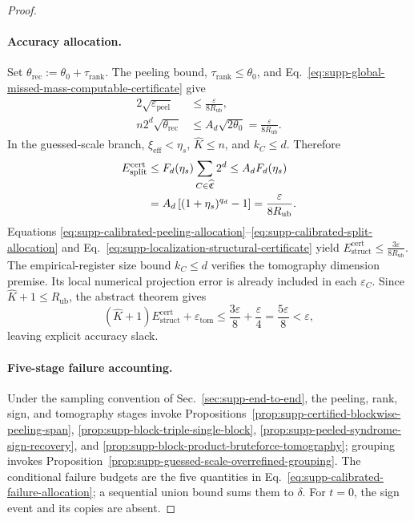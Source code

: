 \documentclass[
  aps,
  prx,
  reprint,
  superscriptaddress,
  amsmath,
  amssymb,
  nofootinbib,
  longbibliography
]{revtex4-2}
\begin{document}
\begin{proof}
\paragraph{Accuracy allocation.}
Set $\theta_{\mathrm{rec}}:=\theta_0+\tau_{\mathrm{rank}}$.  The peeling
bound, $\tau_{\mathrm{rank}}\le\theta_0$, and
Eq.~\eqref{eq:supp-global-missed-mass-computable-certificate} give
\begin{align}
2\sqrt{\varepsilon_{\mathrm{peel}}}
&\le\frac{\varepsilon}{8R_{\mathrm{ub}}},
\label{eq:supp-calibrated-peeling-allocation}\\
n2^d\sqrt{\theta_{\mathrm{rec}}}
&\le A_d\sqrt{2\theta_0}
=\frac{\varepsilon}{8R_{\mathrm{ub}}}.
\label{eq:supp-calibrated-missed-allocation}
\end{align}
In the guessed-scale branch,
\(\xi_{\mathrm{eff}}<\eta_s\), \(\widehat K\le n\), and \(k_C\le d\).
Therefore
\begin{align}
E_{\mathrm{split}}^{\mathrm{cert}}
&\le F_d(\eta_s)\sum_{C\in\widehat{\mathfrak C}}2^d
\le A_dF_d(\eta_s)
\notag\\
&= A_d\left[(1+\eta_s)^{q_d}-1\right]
=\frac{\varepsilon}{8R_{\mathrm{ub}}}.
\label{eq:supp-calibrated-split-allocation}
\end{align}
Equations
\eqref{eq:supp-calibrated-peeling-allocation}--\eqref{eq:supp-calibrated-split-allocation}
and
Eq.~\eqref{eq:supp-localization-structural-certificate} yield
$
E_{\mathrm{struct}}^{\mathrm{cert}}
\le
\frac{3\varepsilon}{8R_{\mathrm{ub}}}
$.
The empirical-register size bound \(k_C\le d\) verifies the tomography
dimension premise.  Its local numerical projection error is already
included in each \(\varepsilon_C\).  Since
\(\widehat K+1\le R_{\mathrm{ub}}\), the abstract theorem gives
\begin{equation}
(\widehat K+1)E_{\mathrm{struct}}^{\mathrm{cert}}
+
\varepsilon_{\mathrm{tom}}
\le
\frac{3\varepsilon}{8}+\frac{\varepsilon}{4}
=\frac{5\varepsilon}{8}
<\varepsilon,
\end{equation}
leaving explicit accuracy slack.

\paragraph{Five-stage failure accounting.}
Under the sampling convention of Sec.~\ref{sec:supp-end-to-end}, the peeling,
rank, sign, and tomography stages invoke
Propositions~\ref{prop:supp-certified-blockwise-peeling-span},
\ref{prop:supp-block-triple-single-block},
\ref{prop:supp-peeled-syndrome-sign-recovery}, and
\ref{prop:supp-block-product-bruteforce-tomography}; grouping invokes
Proposition~\ref{prop:supp-guessed-scale-overrefined-grouping}.  The
conditional failure budgets are the five
quantities in
Eq.~\eqref{eq:supp-calibrated-failure-allocation}; a sequential union bound
sums them to $\delta$.  For $t=0$, the sign event and its copies are absent.


\end{proof}
\end{document}
